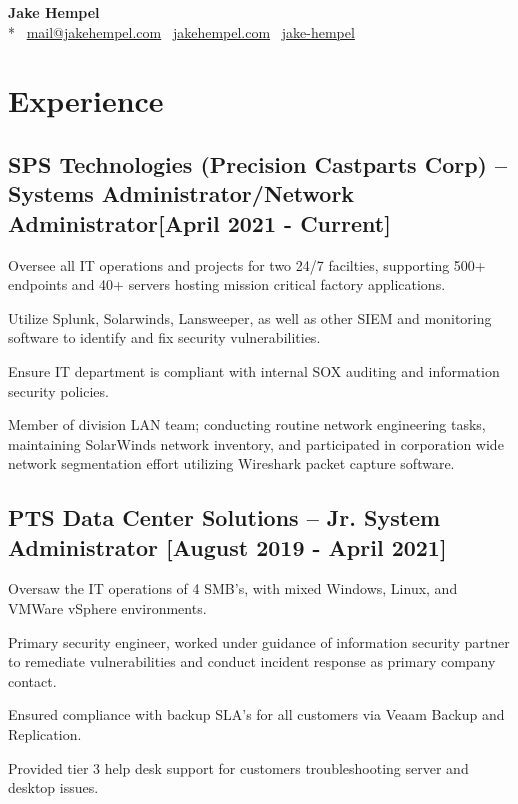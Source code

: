 \documentclass{article}
\begin{document}
\begin{samepage}
\begin{center}
\huge{\textbf{Jake Hempel}} \\*
\large{\faEnvelope \, \href{mailto:mail@jakehempel.com}{mail@jakehempel.com}
\faGlobe \, \href{https://jakehempel.com}{jakehempel.com}}
\faLinkedinSquare \, \href{https://www.linkedin.com/in/jake-hempel/}{jake-hempel}
\end{center}

\section{Experience}
\subsection{SPS Technologies (Precision Castparts Corp) -- Systems Administrator/Network Administrator[April 2021 - Current]}
\begin{compactitem}
	\item Oversee all IT operations and projects for two 24/7 facilties, supporting 500+ endpoints and 40+ servers hosting mission critical factory applications.
	\item Utilize Splunk, Solarwinds, Lansweeper, as well as other SIEM and monitoring software to identify and fix security vulnerabilities.
	\item Ensure IT department is compliant with internal SOX auditing and information security policies.
	\item Member of division LAN team; conducting routine network engineering tasks, maintaining SolarWinds network inventory, and participated in corporation wide network segmentation effort utilizing Wireshark packet capture software.
\end{compactitem}
\subsection{PTS Data Center Solutions -- Jr. System Administrator [August 2019 - April 2021]}
\begin{compactitem}
	\item Oversaw the IT operations of 4 SMB's, with mixed Windows, Linux, and VMWare vSphere environments.
	\item Primary security engineer, worked under guidance of information security partner to remediate vulnerabilities and conduct incident response as primary company contact.
	\item Ensured compliance with backup SLA's for all customers via Veaam Backup and Replication.
	\item Provided tier 3 help desk support for customers troubleshooting server and desktop issues.
\end{compactitem}

\end{samepage}
\end{document}
